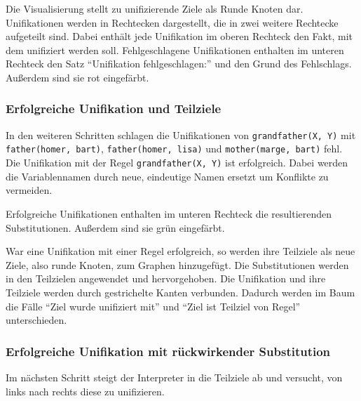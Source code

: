 \documentclass[parskip=full,11pt,twoside]{scrartcl}
\begin{document}
Die Visualisierung stellt zu unifizierende Ziele als Runde Knoten dar.
Unifikationen werden in  Rechtecken dargestellt, die in zwei weitere Rechtecke aufgeteilt sind.
Dabei enthält jede Unifikation im oberen Rechteck den Fakt, mit dem unifiziert werden soll.
Fehlgeschlagene Unifikationen enthalten im unteren Rechteck den Satz \enquote{Unifikation fehlgeschlagen:} und den Grund des Fehlschlags.
Außerdem sind sie rot eingefärbt.

\subsubsection{Erfolgreiche Unifikation und Teilziele}

In den weiteren Schritten schlagen die Unifikationen von \texttt{grandfather(X, Y)} mit \texttt{father(homer, bart)}, \texttt{father(homer, lisa)} und \texttt{mother(marge, bart)} fehl.
Die Unifikation mit der Regel \texttt{grandfather(X, Y)} ist erfolgreich.
Dabei werden die Variablennamen durch neue, eindeutige Namen ersetzt um Konflikte zu vermeiden.

\begin{minipage}{\linewidth}
\end{minipage}

Erfolgreiche Unifikationen enthalten im unteren Rechteck die resultierenden Substitutionen.
Außerdem sind sie grün eingefärbt.

War eine Unifikation mit einer Regel erfolgreich, so werden ihre Teilziele als neue Ziele, also runde Knoten, zum Graphen hinzugefügt.
Die Substitutionen werden in den Teilzielen angewendet und hervorgehoben.
Die Unifikation und ihre Teilziele werden durch gestrichelte Kanten verbunden.
Dadurch werden im Baum die Fälle \enquote{Ziel wurde unifiziert mit} und \enquote{Ziel ist Teilziel von Regel} unterschieden.

\subsubsection{Erfolgreiche Unifikation mit rückwirkender Substitution}

Im nächsten Schritt steigt der Interpreter in die Teilziele ab und versucht, von links nach rechts diese zu unifizieren.

\begin{minipage}{\linewidth}
\end{minipage}
\end{document}
